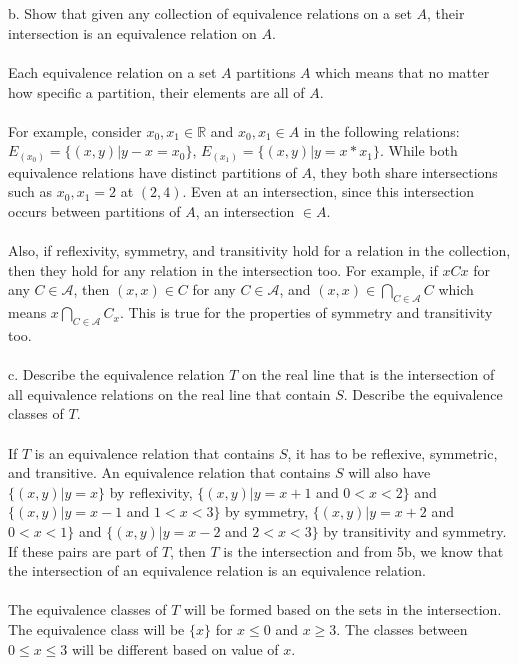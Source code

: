 \documentclass[]{article}
\begin{document}
\begin{enumerate}
    \\\\ b. Show that given any collection of equivalence relations on a set $A$, their intersection is an equivalence relation on $A$.
    \\\\ Each equivalence relation on a set $A$ partitions $A$ which means that no matter how specific a partition, their elements are all of $A$. \\\\ For example, consider $x_0,x_1 \in \mathbb{R}$ and $x_0,x_1 \in A$ in the following relations: $E_{(x_0)}=\{(x,y)|y-x=x_0\}$, $E_{(x_1)}=\{(x,y)|y=x*x_1\}$. While both equivalence relations have distinct partitions of $A$, they both share intersections such as $x_0,x_1=2$ at $(2,4)$. Even at an intersection, since this intersection occurs between partitions of $A$, an intersection $\in A$.
    \\\\ Also, if reflexivity, symmetry, and transitivity hold for a relation in the collection, then they hold for any relation in the intersection too. For example, if $xCx$ for any $C \in \mathcal{A}$, then $(x,x) \in C$ for any $C \in \mathcal{A}$, and $(x,x) \in \bigcap_{C \in \mathcal{A}}C$ which means $x \bigcap_{C \in \mathcal{A}}C_x$. This is true for the properties of symmetry and transitivity too.
    \\\\ c. Describe the equivalence relation $T$ on the real line that is the intersection of all equivalence relations on the real line that contain $S$. Describe the equivalence classes of $T$.
    \\\\ If $T$ is an equivalence relation that contains $S$, it has to be reflexive, symmetric, and transitive. An equivalence relation that contains $S$ will also have $\{(x,y)|y=x\}$ by reflexivity, $\{(x,y)|y=x+1$ and $0<x<2\}$ and $\{(x,y)|y=x-1$ and $1<x<3\}$ by symmetry, $\{(x,y)|y=x+2$ and $0<x<1\}$ and $\{(x,y)|y=x-2$ and $2<x<3\}$ by transitivity and symmetry. If these pairs are part of $T$, then $T$ is the intersection and from 5b, we know that the intersection of an equivalence relation is an equivalence relation. 
    \\\\ The equivalence classes of $T$ will be formed based on the sets in the intersection. The equivalence class will be $\{x\}$ for $x \leq 0$ and $x \geq 3$. The classes between $0 \leq x \leq 3$ will be different based on value of $x$.
    
    
    
\end{enumerate}
\end{document}
